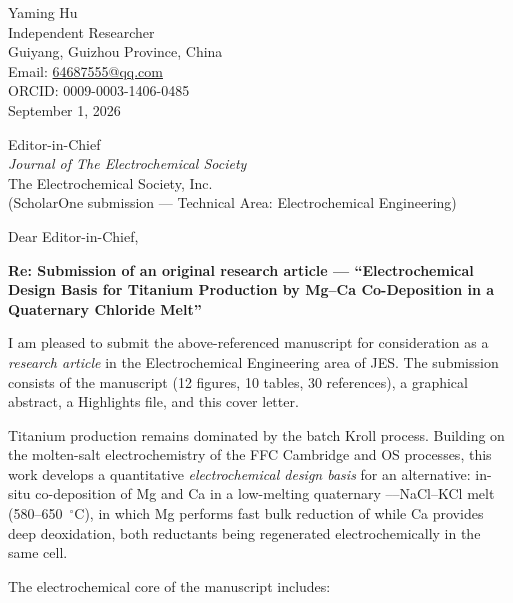 \documentclass[11pt,a4paper]{article}
\begin{document}
\begin{flushright}
Yaming Hu\\
Independent Researcher\\
Guiyang, Guizhou Province, China\\
Email: \href{mailto:64687555@qq.com}{64687555@qq.com}\\
ORCID: 0009-0003-1406-0485\\[0.4em]
September 1, 2026
\end{flushright}

\vspace{0.3em}

\begin{flushleft}
Editor-in-Chief\\
\emph{Journal of The Electrochemical Society}\\
The Electrochemical Society, Inc.\\
(ScholarOne submission --- Technical Area: Electrochemical Engineering)
\end{flushleft}

\vspace{0.4em}

Dear Editor-in-Chief,

\textbf{Re: Submission of an original research article --- ``Electrochemical Design Basis for Titanium Production by Mg--Ca Co-Deposition in a Quaternary Chloride Melt''}

I am pleased to submit the above-referenced manuscript for consideration as a \emph{research article} in the Electrochemical Engineering area of JES. The submission consists of the manuscript (12 figures, 10 tables, 30 references), a graphical abstract, a Highlights file, and this cover letter.

Titanium production remains dominated by the batch Kroll process. Building on the molten-salt electrochemistry of the FFC Cambridge and OS processes, this work develops a quantitative \emph{electrochemical design basis} for an alternative: in-situ co-deposition of Mg and Ca in a low-melting quaternary ----NaCl--KCl melt (580--650~$^{\circ}$C), in which Mg performs fast bulk reduction of  while Ca provides deep deoxidation, both reductants being regenerated electrochemically in the same cell.

The electrochemical core of the manuscript includes:
\end{document}
